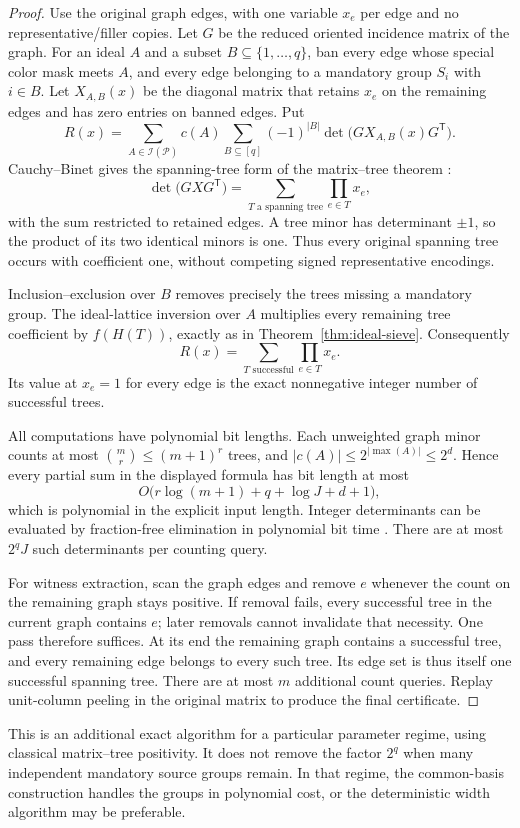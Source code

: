 \begin{proof}
Use the original graph edges, with one variable $x_e$ per edge and no
representative/filler copies.  Let $G$ be the reduced oriented incidence
matrix of the graph.  For an ideal $A$ and a subset
$B\subseteq\{1,\ldots,q\}$, ban every edge whose special color mask meets
$A$, and every edge belonging to a mandatory group $S_i$ with $i\in B$.
Let $X_{A,B}(x)$ be the diagonal matrix that retains $x_e$ on the remaining
edges and has zero entries on banned edges.  Put
\[
    R(x)=\sum_{A\in\mathcal I(\mathcal P)}c(A)
             \sum_{B\subseteq[q]}(-1)^{|B|}
                        \det\bigl(GX_{A,B}(x)G^{\mathsf T}\bigr).
\]
Cauchy--Binet gives the spanning-tree form of the matrix--tree theorem
\cite{Chaiken1982}:
\[
        \det\bigl(GXG^{\mathsf T}\bigr)
           =\sum_{T\text{ a spanning tree}}\prod_{e\in T}x_e,
\]
with the sum restricted to retained edges.  A tree minor has determinant
$\pm1$, so the product of its two identical minors is one.  Thus every
original spanning tree occurs with coefficient one, without competing
signed representative encodings.

Inclusion--exclusion over $B$ removes precisely the trees missing a
mandatory group.  The ideal-lattice inversion over $A$ multiplies every
remaining tree coefficient by $f(H(T))$, exactly as in
Theorem~\ref{thm:ideal-sieve}.  Consequently
\[
               R(x)=\sum_{T\text{ successful}}\prod_{e\in T}x_e.
\]
Its value at $x_e=1$ for every edge is the exact nonnegative integer
number of successful trees.

All computations have polynomial bit lengths.  Each unweighted graph
minor counts at most $\binom{m}{r}\leq(m+1)^r$ trees, and
$|c(A)|\leq2^{|\max(A)|}\leq2^d$.  Hence every partial sum in the displayed
formula has bit length at most
\[
             O\bigl(r\log(m+1)+q+\log J+d+1\bigr),
\]
which is polynomial in the explicit input length.  Integer determinants
can be evaluated by fraction-free elimination in polynomial bit time
\cite{Bareiss1968}.
There are at most $2^qJ$ such determinants per counting query.

For witness extraction, scan the graph edges and remove $e$ whenever the
count on the remaining graph stays positive.  If removal fails, every
successful tree in the current graph contains $e$; later removals cannot
invalidate that necessity.  One pass therefore suffices.  At its end the
remaining graph contains a successful tree, and every remaining edge
belongs to every such tree.  Its edge set is thus itself one successful
spanning tree.  There are at most $m$ additional count queries.  Replay
unit-column peeling in the original matrix to produce the final certificate.
\end{proof}

This is an additional exact algorithm for a particular parameter regime,
using classical matrix--tree positivity.  It does not remove the factor
$2^q$ when many independent mandatory source groups remain.  In that
regime, the common-basis construction handles the groups in polynomial
cost, or the deterministic width algorithm may be preferable.
